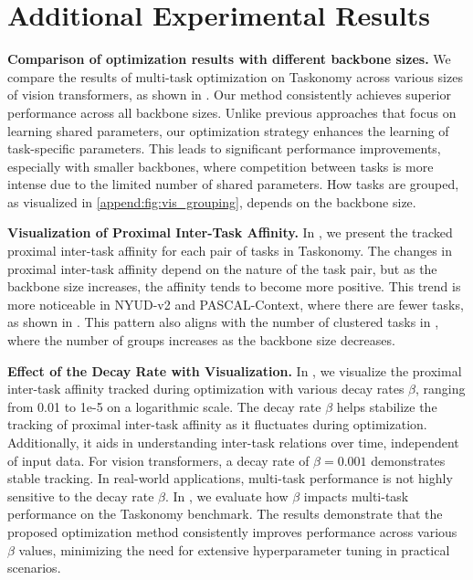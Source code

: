 \section{Additional Experimental Results}
\label{append:additional_experimental_results}
\setcounter{table}{0}
\setcounter{figure}{0}

\textbf{Comparison of optimization results with different backbone sizes.} We compare the results of multi-task optimization on Taskonomy across various sizes of vision transformers, as shown in . Our method consistently achieves superior performance across all backbone sizes. Unlike previous approaches that focus on learning shared parameters, our optimization strategy enhances the learning of task-specific parameters. This leads to significant performance improvements, especially with smaller backbones, where competition between tasks is more intense due to the limited number of shared parameters. How tasks are grouped, as visualized in \cref{append:fig:vis_grouping}, depends on the backbone size.

\textbf{Visualization of Proximal Inter-Task Affinity.} In , we present the tracked proximal inter-task affinity for each pair of tasks in Taskonomy. The changes in proximal inter-task affinity depend on the nature of the task pair, but as the backbone size increases, the affinity tends to become more positive. This trend is more noticeable in NYUD-v2 and PASCAL-Context, where there are fewer tasks, as shown in . This pattern also aligns with the number of clustered tasks in , where the number of groups increases as the backbone size decreases.

\textbf{Effect of the Decay Rate with Visualization.} In , we visualize the proximal inter-task affinity tracked during optimization with various decay rates $\beta$, ranging from 0.01 to 1e-5 on a logarithmic scale. The decay rate $\beta$ helps stabilize the tracking of proximal inter-task affinity as it fluctuates during optimization. Additionally, it aids in understanding inter-task relations over time, independent of input data. For vision transformers, a decay rate of $\beta=0.001$ demonstrates stable tracking. In real-world applications, multi-task performance is not highly sensitive to the decay rate $\beta$. In , we evaluate how $\beta$ impacts multi-task performance on the Taskonomy benchmark. The results demonstrate that the proposed optimization method consistently improves performance across various $\beta$ values, minimizing the need for extensive hyperparameter tuning in practical scenarios.

